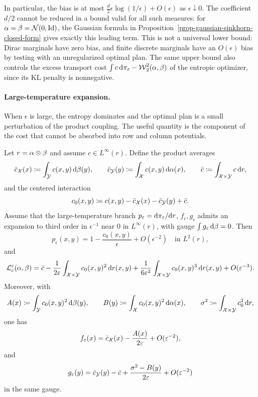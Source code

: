 In particular, the bias is at most $\frac d2\epsilon\log(1/\epsilon)+O(\epsilon)$ as $\epsilon\downarrow0$. The coefficient $d/2$ cannot be reduced in a bound valid for all such measures: for $\alpha=\beta=\mathcal{N}(0,\mathrm{Id})$, the Gaussian formula in Proposition~\ref{prop-gaussian-sinkhorn-closed-form} gives exactly this leading term. This is not a universal lower bound: Dirac marginals have zero bias, and finite discrete marginals have an $O(\epsilon)$ bias by testing with an unregularized optimal plan. The same upper bound also controls the excess transport cost $\int c\,\mathrm{d}\pi_\varepsilon-\operatorname{\mathcal{W}}_2^2(\alpha,\beta)$ of the entropic optimizer, since its KL penalty is nonnegative.

\paragraph{Large-temperature expansion.}

When $\epsilon$ is large, the entropy dominates and the optimal plan is a small perturbation of the product coupling. The useful quantity is the component of the cost that cannot be absorbed into row and column potentials.

\begin{prop}\label{prop-large-epsilon-expansion}
	Let $r=\alpha\otimes\beta$ and assume $c\in L^\infty(r)$. Define the product averages
	\[
		\bar c_{\mathcal{X}}(x)\coloneqq\int_{\mathcal{Y}} c(x,y)\,\mathrm{d}\beta(y),\qquad
		\bar c_{\mathcal{Y}}(y)\coloneqq\int_{\mathcal{X}} c(x,y)\,\mathrm{d}\alpha(x),\qquad
		\bar c\coloneqq\int_{\mathcal{X}\times\mathcal{Y}}c\,\mathrm{d} r,
	\]
	and the centered interaction
	\[
		c_0(x,y)\coloneqq c(x,y)-\bar c_{\mathcal{X}}(x)-\bar c_{\mathcal{Y}}(y)+\bar c.
	\]
	Assume that the large-temperature branch $p_\varepsilon=\mathrm{d}\pi_\varepsilon/\mathrm{d} r$, $f_\epsilon,g_\epsilon$ admits an expansion to third order in $\epsilon^{-1}$ near $0$ in $L^\infty(r)$, with gauge $\int g_\varepsilon\,\mathrm{d}\beta=0$. Then
	\[
		p_\epsilon(x,y)=1-\frac{c_0(x,y)}{\epsilon}+O(\epsilon^{-2})
		\quad\text{in }L^2(r),
	\]
	and
	\[
		\mathcal{L}_c^\varepsilon(\alpha,\beta)
		=
		\bar c-\frac{1}{2\varepsilon}\int_{\mathcal{X}\times\mathcal{Y}} c_0(x,y)^2\,\mathrm{d} r(x,y)
		+\frac{1}{6\varepsilon^2}\int_{\mathcal{X}\times\mathcal{Y}} c_0(x,y)^3\,\mathrm{d} r(x,y)
		+O(\varepsilon^{-3}).
	\]
	Moreover, with
	\[
		A(x)\coloneqq\int_{\mathcal{Y}} c_0(x,y)^2\,\mathrm{d}\beta(y),\qquad
		B(y)\coloneqq\int_{\mathcal{X}} c_0(x,y)^2\,\mathrm{d}\alpha(x),\qquad
		\sigma^2\coloneqq\int_{\mathcal{X}\times\mathcal{Y}}c_0^2\,\mathrm{d} r,
	\]
	one has
	\[
		f_\varepsilon(x)=\bar c_{\mathcal{X}}(x)-\frac{A(x)}{2\varepsilon}+O(\varepsilon^{-2}),
	\]
	and
	\[
		g_\varepsilon(y)=\bar c_{\mathcal{Y}}(y)-\bar c
		+\frac{\sigma^2-B(y)}{2\varepsilon}+O(\varepsilon^{-2})
	\]
	in the same gauge.
\end{prop}

